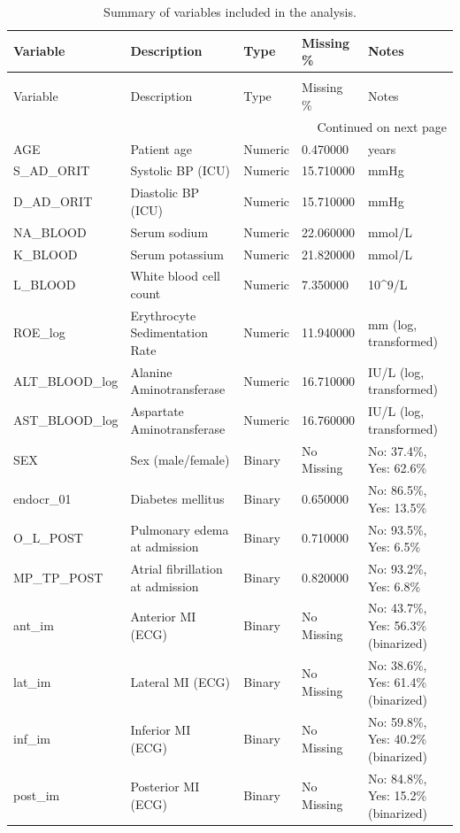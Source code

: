\begin{longtable}{lllll}
\caption{Summary of variables included in the analysis.} \label{tab:variable_summary} \\
\toprule
Variable & Description & Type & Missing \% & Notes \\
\midrule
\endfirsthead
\caption[]{Summary of variables included in the analysis.} \\
\toprule
Variable & Description & Type & Missing \% & Notes \\
\midrule
\endhead
\midrule
\multicolumn{5}{r}{Continued on next page} \\
\midrule
\endfoot
\bottomrule
\endlastfoot
AGE & Patient age & Numeric & 0.470000 & years \\
S\_AD\_ORIT & Systolic BP (ICU) & Numeric & 15.710000 & mmHg \\
D\_AD\_ORIT & Diastolic BP (ICU) & Numeric & 15.710000 & mmHg \\
NA\_BLOOD & Serum sodium & Numeric & 22.060000 & mmol/L \\
K\_BLOOD & Serum potassium & Numeric & 21.820000 & mmol/L \\
L\_BLOOD & White blood cell count & Numeric & 7.350000 & 10\textasciicircum 9/L \\
ROE\_log & Erythrocyte Sedimentation Rate & Numeric & 11.940000 & mm (log, transformed) \\
ALT\_BLOOD\_log & Alanine Aminotransferase & Numeric & 16.710000 & IU/L (log, transformed) \\
AST\_BLOOD\_log & Aspartate Aminotransferase & Numeric & 16.760000 & IU/L (log, transformed) \\
SEX & Sex (male/female) & Binary & No Missing & No: 37.4\%, Yes: 62.6\% \\
endocr\_01 & Diabetes mellitus & Binary & 0.650000 & No: 86.5\%, Yes: 13.5\% \\
O\_L\_POST & Pulmonary edema at admission & Binary & 0.710000 & No: 93.5\%, Yes: 6.5\% \\
MP\_TP\_POST & Atrial fibrillation at admission & Binary & 0.820000 & No: 93.2\%, Yes: 6.8\% \\
ant\_im & Anterior MI (ECG) & Binary & No Missing & No: 43.7\%, Yes: 56.3\% (binarized) \\
lat\_im & Lateral MI (ECG) & Binary & No Missing & No: 38.6\%, Yes: 61.4\% (binarized) \\
inf\_im & Inferior MI (ECG) & Binary & No Missing & No: 59.8\%, Yes: 40.2\% (binarized) \\
post\_im & Posterior MI (ECG) & Binary & No Missing & No: 84.8\%, Yes: 15.2\% (binarized) \\

\end{longtable}

